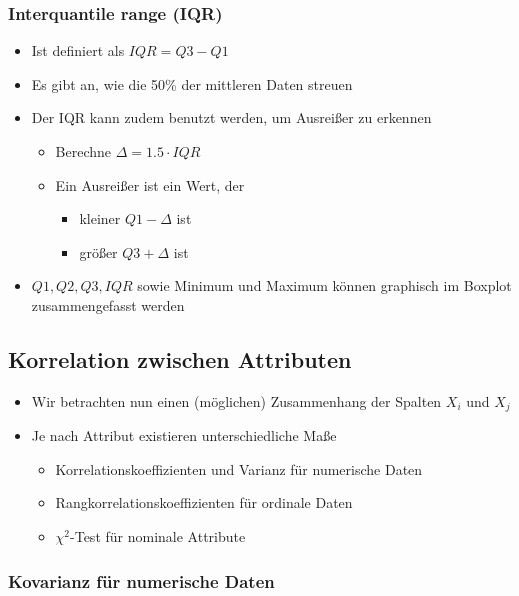 \documentclass{scrartcl}
\begin{document}
\subsubsection{Interquantile range (IQR)}

\begin{itemize}
	\item Ist definiert als $ IQR = Q3 - Q1 $
	\item Es gibt an, wie die 50\% der mittleren Daten streuen
	\item Der IQR kann zudem benutzt werden, um Ausreißer zu erkennen
	\begin{itemize}
		\item Berechne $ \Delta = 1.5 \cdot IQR $
		\item Ein Ausreißer ist ein Wert, der
		\begin{itemize}
			\item kleiner $ Q1 - \Delta $ ist
			\item größer $ Q3 + \Delta $ ist
		\end{itemize}
	\end{itemize}
	\item $ Q1,Q2,Q3,IQR $ sowie Minimum und Maximum können graphisch im 
	Boxplot zusammengefasst werden
\end{itemize}

\subsection{Korrelation zwischen Attributen}

\begin{itemize}
	\item Wir betrachten nun einen (möglichen) Zusammenhang der Spalten $ X_i $ 
	und $ X_j $
	\item Je nach Attribut existieren unterschiedliche Maße
	\begin{itemize}
		\item Korrelationskoeffizienten und Varianz für numerische Daten
		\item Rangkorrelationskoeffizienten für ordinale Daten
		\item $ \chi^2 $-Test für nominale Attribute
	\end{itemize}
\end{itemize}

\subsubsection{Kovarianz für numerische Daten}
\end{document}
